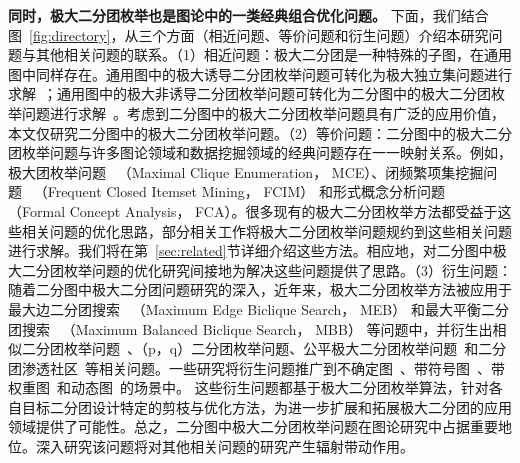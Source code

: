 \textbf{同时，极大二分团枚举也是图论中的一类经典组合优化问题。}
下面，我们结合图~\ref{fig:directory}，从三个方面（相近问题、等价问题和衍生问题）介绍本研究问题与其他相关问题的联系。（1）相近问题：极大二分团是一种特殊的子图，在通用图中同样存在。通用图中的极大诱导二分团枚举问题可转化为极大独立集问题进行求解~\cite{MBE-induced21}；通用图中的极大非诱导二分团枚举问题可转化为二分图中的极大二分团枚举问题进行求解~\cite{Proof09}。考虑到二分图中的极大二分团枚举问题具有广泛的应用价值，本文仅研究二分图中的极大二分团枚举问题。（2）等价问题：二分图中的极大二分团枚举问题与许多图论领域和数据挖掘领域的经典问题存在一一映射关系。例如，极大团枚举问题~\cite{MCEchinese17,MCE20,MCEchinese20,MCE-GPU21,MCEchinese21,MCE22,MCEreview22} （Maximal Clique Enumeration， MCE）、闭频繁项集挖掘问题~\cite{FCIM98,FCIM22} （Frequent Closed Itemset Mining， FCIM） 和形式概念分析问题~\cite{FCA21,FCA22} （Formal Concept Analysis， FCA）。很多现有的极大二分团枚举方法都受益于这些相关问题的优化思路，部分相关工作将极大二分团枚举问题规约到这些相关问题进行求解。我们将在第~\ref{sec:related}节详细介绍这些方法。相应地，对二分图中极大二分团枚举问题的优化研究间接地为解决这些问题提供了思路。（3）衍生问题：随着二分图中极大二分团问题研究的深入，近年来，极大二分团枚举方法被应用于最大边二分团搜索~\cite{MEB20,MEB22} （Maximum Edge Biclique Search， MEB） 和最大平衡二分团搜索~\cite{MBB21} （Maximum Balanced Biclique Search， MBB） 等问题中，并衍生出相似二分团枚举问题~\cite{SimilarMBE22}、（p，q）二分团枚举问题\cite{Pqbiclique21,Pqbiclique23,Pq23,pqchinese22}、公平极大二分团枚举问题~\cite{FairMBE23}和二分团渗透社区~\cite{BicliqueCommunity23}等相关问题。一些研究将衍生问题推广到不确定图~\cite{MBEU23}、带符号图~\cite{Sun22,Sun23}、带权重图~\cite{WeightMEB22,WeightMBB22}和动态图~\cite{Ma22}的场景中。
这些衍生问题都基于极大二分团枚举算法，针对各自目标二分团设计特定的剪枝与优化方法，为进一步扩展和拓展极大二分团的应用领域提供了可能性。总之，二分图中极大二分团枚举问题在图论研究中占据重要地位。深入研究该问题将对其他相关问题的研究产生辐射带动作用。


